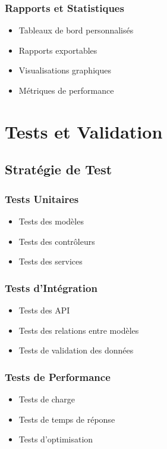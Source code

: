 \documentclass[12pt,a4paper]{report}
\begin{document}
\subsection{Rapports et Statistiques}
\begin{itemize}
    \item Tableaux de bord personnalisés
    \item Rapports exportables
    \item Visualisations graphiques
    \item Métriques de performance
\end{itemize}

\chapter{Tests et Validation}
\section{Stratégie de Test}
\subsection{Tests Unitaires}
\begin{itemize}
    \item Tests des modèles
    \item Tests des contrôleurs
    \item Tests des services
\end{itemize}

\subsection{Tests d'Intégration}
\begin{itemize}
    \item Tests des API
    \item Tests des relations entre modèles
    \item Tests de validation des données
\end{itemize}

\subsection{Tests de Performance}
\begin{itemize}
    \item Tests de charge
    \item Tests de temps de réponse
    \item Tests d'optimisation
\end{itemize}
\end{document}
